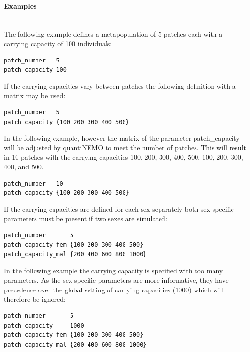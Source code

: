 \documentclass[letterpaper,12pt,oneside]{book}
\begin{document}
\begin{description}
\paragraph{Examples}\hspace*{\fill}\\
The following example defines a metapopulation of 5 patches each with a carrying capacity of 100 individuals:
\begin{lstlisting}[frame=single]
patch_number   5
patch_capacity 100
\end{lstlisting}

If the carrying capacities vary between patches the following definition with a matrix may be used:
\begin{lstlisting}[frame=single]
patch_number   5
patch_capacity {100 200 300 400 500}
\end{lstlisting}

In the following example, however the matrix of the parameter \textsf{patch\_capacity} will be adjusted by quantiNEMO to meet the number of patches. This will result in 10 patches with the carrying capacities 100, 200, 300, 400, 500, 100, 200, 300, 400, and 500.
\begin{lstlisting}[frame=single]
patch_number   10
patch_capacity {100 200 300 400 500}
\end{lstlisting}
           																																																																			
If the carrying capacities are defined for each sex separately both sex specific parameters must be present if two sexes are simulated:
\begin{lstlisting}[frame=single]
patch_number       5
patch_capacity_fem {100 200 300 400 500}
patch_capacity_mal {200 400 600 800 1000}
\end{lstlisting}

In the following example the carrying capacity is specified with too many parameters. As the sex specific parameters are more informative, they have precedence over the global setting of carrying capacities (1000) which will therefore be ignored:
\begin{lstlisting}[frame=single]
patch_number       5
patch_capacity     1000
patch_capacity_fem {100 200 300 400 500}      
patch_capacity_mal {200 400 600 800 1000}
\end{lstlisting}


\end{description}
\end{document}
